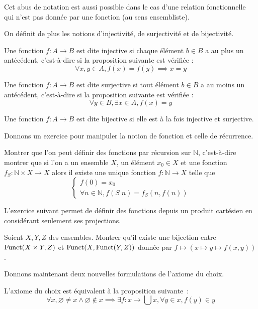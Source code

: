 \begin{remark}
  Cet abus de notation est aussi possible dans le cas d'une relation
  fonctionnelle qui n'est pas donnée par une fonction (au sens ensembliste).
\end{remark}

On définit de plus les notions d'injectivité, de surjectivité et de bijectivité.

\begin{definition}
  Une fonction $f : A \to B$ est dite injective si chaque élément $b\in B$ a au
  plus un antécédent, c'est-à-dire si la proposition suivante est vérifiée :
  \[\forall x,y\in A, f(x) = f(y)\implies x=y\]

  Une fonction $f : A \to B$ est dite surjective si tout élément $b\in B$ a au
  moins un antécédent, c'est-à-dire si la proposition suivante est vérifiée :
  \[\forall y\in B, \exists x \in A, f(x)=y\]

  Une fonction $f : A \to B$ est dite bijective si elle est à la fois injective
  et surjective.
\end{definition}

Donnons un exercice pour manipuler la notion de fonction et celle de récurrence.

\begin{exercise}
  Montrer que l'on peut définir des fonctions par récursion sur $\mathbb N$,
  c'est-à-dire montrer que si l'on a un ensemble $X$, un élément $x_0\in X$ et
  une fonction $f_S : \mathbb N \times X \to X$ alors il existe une unique
  fonction $f : \mathbb N \to X$ telle que
  \[\begin{cases}
  f(0) = x_0\\
  \forall n \in \mathbb N, f(S\;n) = f_S(n,f(n))
  \end{cases}\]
\end{exercise}

L'exercice suivant permet de définir des fonctions depuis un produit cartésien
en considérant seulement ses projections.

\begin{exercise}
  Soient $X,Y,Z$ des ensembles. Montrer qu'il existe une bijection entre
  $\operatorname{Funct}(X\times Y,Z)$ et $\operatorname{Funct}(X,\operatorname{Funct}(Y,Z))$ donnée par
  $f\mapsto (x\mapsto y \mapsto f(x,y))$.
\end{exercise}

Donnons maintenant deux nouvelles formulations de l'axiome du choix.

\begin{proposition}
  L'axiome du choix est équivalent à la proposition suivante~:
  \[\forall x, \varnothing\neq x \land \varnothing\notin x \implies
  \exists f : x \to \bigcup x, \forall y \in x, f(y) \in y\]
\end{proposition}

